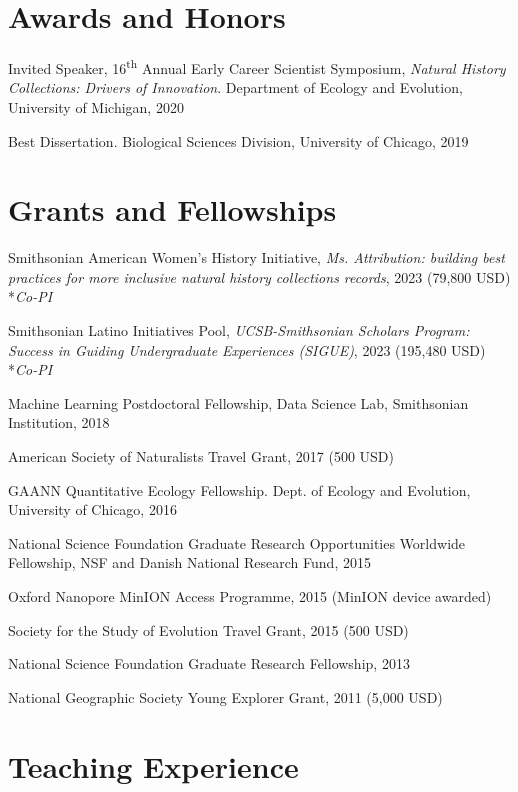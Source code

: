 \documentclass[letterpaper]{article}
\renewenvironment{itemize}{
  \begin{list}{}{
    \setlength{\leftmargin}{1.5em}
  }
}{
  \end{list}
}
\newenvironment{biblist}{%
   \begin{list}{}{%
     \setlength{\labelwidth}{0pt}%
     \setlength{\labelsep}{1em}%
     \setlength{\leftmargin}{2em}%
     \setlength{\itemindent}{-1em}%
   }
}{\end{list}}
\begin{document}
\section*{Awards and Honors}
\begin{biblist}
\item Invited Speaker, 16\textsuperscript{th} Annual Early Career Scientist Symposium, \textit{Natural History Collections: Drivers of Innovation}. Department of Ecology and Evolution, University of Michigan, 2020

\item Best Dissertation. Biological Sciences Division, University of Chicago, 2019
\end{biblist}

\section*{Grants and Fellowships}
\begin{itemize}
\item Smithsonian American Women's History Initiative, \textit{Ms. Attribution: building best practices for more inclusive natural history collections records}, 2023 (79,800 USD) *\textit{Co-PI}
\item Smithsonian Latino Initiatives Pool, \textit{UCSB-Smithsonian Scholars Program: Success in Guiding Undergraduate Experiences (SIGUE)}, 2023 (195,480 USD) *\textit{Co-PI}
\item Machine Learning Postdoctoral Fellowship, Data Science Lab, Smithsonian Institution, 2018
\item American Society of Naturalists Travel Grant, 2017 (500 USD)
\item GAANN Quantitative Ecology Fellowship. Dept. of Ecology and Evolution, University of Chicago, 2016
\item National Science Foundation Graduate Research Opportunities Worldwide Fellowship, NSF and Danish National Research Fund, 2015
\item Oxford Nanopore MinION Access Programme, 2015 (MinION device awarded)
\item Society for the Study of Evolution Travel Grant, 2015 (500 USD)
\item National Science Foundation Graduate Research Fellowship, 2013
\item National Geographic Society Young Explorer Grant, 2011 (5,000 USD)
\end{itemize}

\section*{Teaching Experience}
\end{document}

